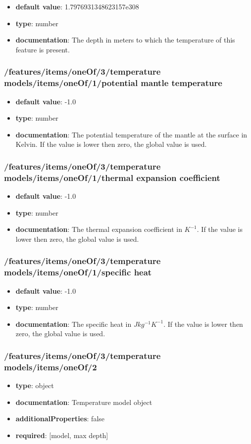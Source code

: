 \begin{itemize}\item {\bf default value}: 1.7976931348623157e308
\item {\bf type}: number
\item {\bf documentation}: The depth in meters to which the temperature of this feature is present.
\end{itemize}\subsubsection{/features/items/oneOf/3/temperature models/items/oneOf/1/potential mantle temperature}
\begin{itemize}\item {\bf default value}: -1.0
\item {\bf type}: number
\item {\bf documentation}: The potential temperature of the mantle at the surface in Kelvin. If the value is lower then zero, the global value is used.
\end{itemize}\subsubsection{/features/items/oneOf/3/temperature models/items/oneOf/1/thermal expansion coefficient}
\begin{itemize}\item {\bf default value}: -1.0
\item {\bf type}: number
\item {\bf documentation}: The thermal expansion coefficient in $K^{-1}$. If the value is lower then zero, the global value is used.
\end{itemize}\subsubsection{/features/items/oneOf/3/temperature models/items/oneOf/1/specific heat}
\begin{itemize}\item {\bf default value}: -1.0
\item {\bf type}: number
\item {\bf documentation}: The specific heat in $J kg^{-1} K^{-1}$. If the value is lower then zero, the global value is used.
\end{itemize}\subsubsection{/features/items/oneOf/3/temperature models/items/oneOf/2}
\begin{itemize}\item {\bf type}: object
\item {\bf documentation}: Temperature model object
\item {\bf additionalProperties}: false
\item {\bf required}: [model, max depth]\end{itemize}
